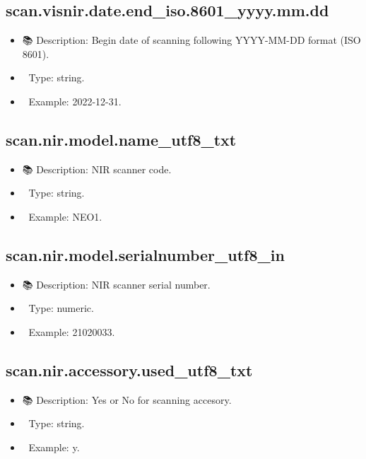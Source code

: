 \documentclass[
  letterpaper,
  DIV=11,
  numbers=noendperiod]{scrreprt}
\providecommand{\tightlist}{%
  \setlength{\itemsep}{0pt}\setlength{\parskip}{0pt}}\usepackage{longtable,booktabs,array}
\begin{document}
\subsection{scan.visnir.date.end\_iso.8601\_yyyy.mm.dd}\label{scan.visnir.date.end_iso.8601_yyyy.mm.dd-1}

\begin{itemize}
\tightlist
\item
  📚 Description: Begin date of scanning following YYYY-MM-DD format
  (ISO 8601).
\item
  🔢 Type: string.
\item
  📖 Example: 2022-12-31.
\end{itemize}

\subsection{scan.nir.model.name\_utf8\_txt}\label{scan.nir.model.name_utf8_txt}

\begin{itemize}
\tightlist
\item
  📚 Description: NIR scanner code.
\item
  🔢 Type: string.
\item
  📖 Example: NEO1.
\end{itemize}

\subsection{scan.nir.model.serialnumber\_utf8\_in}\label{scan.nir.model.serialnumber_utf8_in}

\begin{itemize}
\tightlist
\item
  📚 Description: NIR scanner serial number.
\item
  🔢 Type: numeric.
\item
  📖 Example: 21020033.
\end{itemize}

\subsection{scan.nir.accessory.used\_utf8\_txt}\label{scan.nir.accessory.used_utf8_txt}

\begin{itemize}
\tightlist
\item
  📚 Description: Yes or No for scanning accesory.
\item
  🔢 Type: string.
\item
  📖 Example: y.
\end{itemize}
\end{document}

